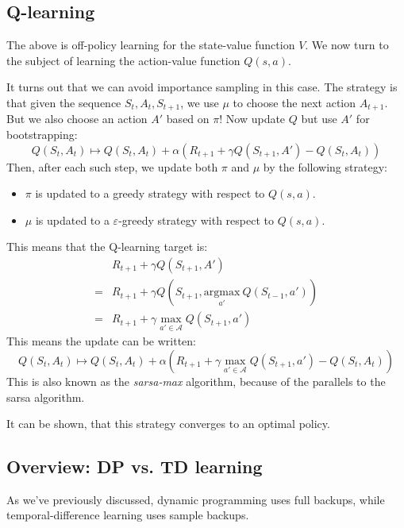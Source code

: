\documentclass[12pt, a4paper]{article}
\numberwithin{equation}{section}
\begin{document}
\subsection{Q-learning}
The above is off-policy learning for the state-value function $V$. We now turn to the subject of learning the action-value function $Q(s,a)$.

It turns out that we can avoid importance sampling in this case. The strategy is that given the sequence $S_t, A_t, S_{t+1}$, we use $\mu$ to choose the next action $A_{t+1}$. But we also choose an action $A'$ based on $\pi$! Now update $Q$ but use $A'$ for bootstrapping:
\begin{equation}
Q(S_t,A_t)\mapsto Q(S_t,A_t)+\alpha(R_{t+1}+\gamma Q(S_{t+1},A')-Q(S_t,A_t))
\end{equation}
Then, after each such step, we update both $\pi$ and $\mu$ by the following strategy:
\begin{itemize}
\item $\pi$ is updated to a greedy strategy with respect to $Q(s,a)$.
\item $\mu$ is updated to a $\varepsilon$-greedy strategy with respect to $Q(s,a)$.
\end{itemize}
This means that the Q-learning target is:
\begin{align}
&R_{t+1}+\gamma Q(S_{t+1},A')\\
=&R_{t+1}+\gamma Q\left(S_{t+1},\underset{a'}{\textrm{argmax}}\ Q(S_{t-1},a')\right)\\
=&R_{t+1}+\gamma\max_{a'\in\mathcal{A}}Q(S_{t+1},a')
\end{align}
This means the update can be written:
\begin{equation}
Q(S_t,A_t)\mapsto Q(S_t,A_t)+\alpha\left(R_{t+1}+\gamma\max_{a'\in\mathcal{A}}Q(S_{t+1},a')-Q(S_t,A_t)\right)
\end{equation}
This is also known as the \textit{sarsa-max} algorithm, because of the parallels to the sarsa algorithm.

It can be shown, that this strategy converges to an optimal policy.

\subsection{Overview: DP vs. TD learning}
As we've previously discussed, dynamic programming uses full backups, while temporal-difference learning uses sample backups.
\end{document}
